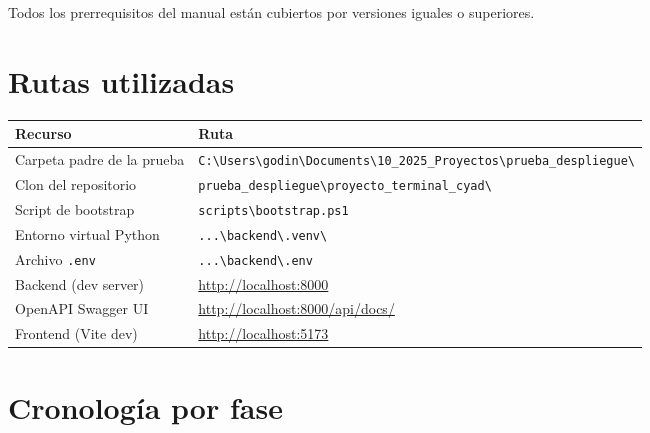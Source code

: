 \documentclass{computacion}
\begin{document}
Todos los prerrequisitos del manual están cubiertos por versiones iguales o superiores.

\section{Rutas utilizadas}

\begin{longtable}{p{} p{}}
    \toprule
    \textbf{Recurso} & \textbf{Ruta} \\
    \midrule
    \endhead
    Carpeta padre de la prueba & \texttt{C:\textbackslash Users\textbackslash godin\textbackslash Documents\textbackslash 10\_2025\_Proyectos\textbackslash prueba\_despliegue\textbackslash} \\
    Clon del repositorio       & \texttt{prueba\_despliegue\textbackslash proyecto\_terminal\_cyad\textbackslash} \\
    Script de bootstrap        & \texttt{scripts\textbackslash bootstrap.ps1} \\
    Entorno virtual Python     & \texttt{...\textbackslash backend\textbackslash .venv\textbackslash} \\
    Archivo \texttt{.env}      & \texttt{...\textbackslash backend\textbackslash .env} \\
    Backend (dev server)       & \url{http://localhost:8000} \\
    OpenAPI Swagger UI         & \url{http://localhost:8000/api/docs/} \\
    Frontend (Vite dev)        & \url{http://localhost:5173} \\
    \bottomrule
\end{longtable}

\section{Cronología por fase}
\end{document}
